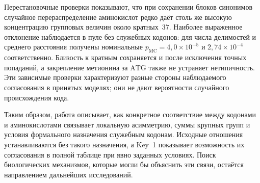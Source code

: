 \documentclass[11pt,a4paper]{article}
\renewcommand{\_}{\origunderscore\allowbreak}
\begin{document}
Перестановочные проверки показывают, что при сохранении блоков синонимов случайное перераспределение
аминокислот редко даёт столь же высокую концентрацию
групповых величин около кратных~$37$. Наиболее выраженное
отклонение наблюдается в пуле без служебных кодонов:
для числа делимостей и среднего расстояния получены
номинальные $p_{\mathrm{MC}}=4{,}0\times10^{-5}$ и
$2{,}74\times10^{-4}$ соответственно. Близость к кратным
сохраняется и после исключения точных попаданий, а закрепление
метионина за $\mathrm{ATG}$ также не устраняет нетипичность.
Эти зависимые проверки характеризуют разные стороны
наблюдаемого согласования в принятых моделях;
они не дают вероятности случайного происхождения кода.

Таким образом, работа описывает, как конкретное соответствие
между кодонами и аминокислотами связывает локальную
асимметрию, суммы крупных групп и условия формального
назначения служебным кодонам. Исходные отношения устанавливаются
без такого назначения, а Key~1 показывает возможность их
согласования в полной таблице при явно заданных условиях.
Поиск биологических механизмов, которые могли бы объяснить
эти связи, остаётся направлением дальнейших исследований.


\end{document}
